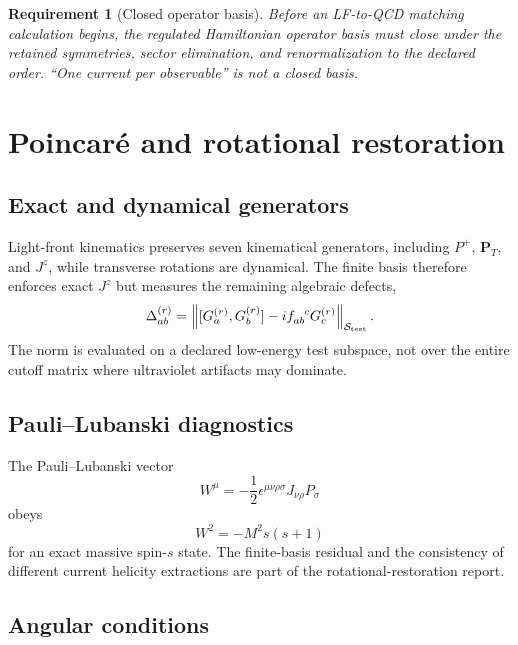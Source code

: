 \documentclass[11pt]{article}
\newtheorem{requirement}[definition]{Requirement}
\newcommand{\cS}{\mathcal S}
\newcommand{\Jz}{J^z}
\begin{document}
\begin{requirement}[Closed operator basis]
Before an LF-to-QCD matching calculation begins, the regulated Hamiltonian
operator basis must close under the retained symmetries, sector elimination,
and renormalization to the declared order.  ``One current per observable'' is
not a closed basis.
\label{req:closed-operator-basis}
\end{requirement}

\section{Poincar\'e and rotational restoration}
\label{sec:poincare}

\subsection{Exact and dynamical generators}

Light-front kinematics preserves seven kinematical generators, including
\(P^+\), \(\bm P_T\), and \(J^z\), while transverse rotations are dynamical.
The finite basis therefore enforces exact \(\Jz\) but measures the remaining
algebraic defects,
\begin{equation}
 \Delta_{ab}^{(r)}
 =\left\|
 [G_a^{(r)},G_b^{(r)}]
 -if_{ab}^{\ \ c}G_c^{(r)}
 \right\|_{\cS_{\rm test}}.
 \label{eq:poincare-defect}
\end{equation}
The norm is evaluated on a declared low-energy test subspace, not over the
entire cutoff matrix where ultraviolet artifacts may dominate.

\subsection{Pauli--Lubanski diagnostics}

The Pauli--Lubanski vector
\begin{equation}
 W^\mu=-\frac12\epsilon^{\mu\nu\rho\sigma}
 J_{\nu\rho}P_\sigma
 \label{eq:pauli-lubanski}
\end{equation}
obeys
\begin{equation}
 W^2=-M^2s(s+1)
 \label{eq:w2}
\end{equation}
for an exact massive spin-\(s\) state.  The finite-basis residual and the
consistency of different current helicity extractions are part of the
rotational-restoration report.

\subsection{Angular conditions}
\end{document}
